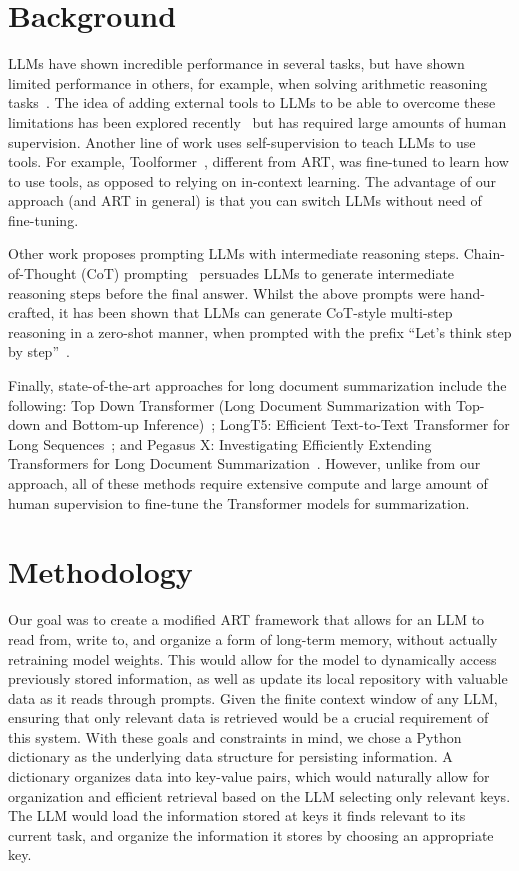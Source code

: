\documentclass{article}
\begin{document}
\section{Background}
LLMs have shown incredible performance in several tasks, but have shown limited performance in others, for example, when solving arithmetic reasoning tasks~\cite{imani2023mathprompter}.
The idea of adding external tools to LLMs to be able to overcome these limitations has been explored recently~\cite{shuster2022language} but has required large amounts of human supervision.
Another line of work uses self-supervision to teach LLMs to use tools. For example, Toolformer~\cite{schick2023toolformer}, different from ART, was fine-tuned to learn how to use tools, as opposed to relying on in-context learning.
The advantage of our approach (and ART in general) is that you can switch LLMs without need of fine-tuning.

Other work proposes prompting LLMs with intermediate reasoning steps. Chain-of-Thought (CoT) prompting~\cite{wei2023chainofthought} persuades LLMs to generate intermediate reasoning steps before the final answer.
Whilst the above prompts were hand-crafted, it has been shown that LLMs can generate CoT-style multi-step reasoning in a zero-shot manner, when prompted with the prefix ``Let's think step by step''~\cite{kojima2023large}.

Finally, state-of-the-art approaches for long document summarization include the following: Top Down Transformer (Long Document Summarization with Top-down and Bottom-up Inference)~\cite{pang2022long}; LongT5: Efficient Text-to-Text Transformer for Long Sequences~\cite{guo2022longt5}; and Pegasus X: Investigating Efficiently Extending Transformers for Long Document Summarization~\cite{phang2022investigating}.
However, unlike from our approach, all of these methods require extensive compute and large amount of human supervision to fine-tune the Transformer models for summarization.


\section{Methodology}


Our goal was to create a modified ART framework that allows for an LLM to read from, write to, and organize a form of long-term memory, without actually retraining model weights.
This would allow for the model to dynamically access previously stored information, as well as update its local repository with valuable data as it reads through prompts.
Given the finite context window of any LLM, ensuring that only relevant data is retrieved would be a crucial requirement of this system.
With these goals and constraints in mind, we chose a Python dictionary as the underlying data structure for persisting information.
A dictionary organizes data into key-value pairs, which would naturally allow for organization and efficient retrieval based on the LLM selecting only relevant keys.
The LLM would load the information stored at keys it finds relevant to its current task, and organize the information it stores by choosing an appropriate key.
\end{document}
